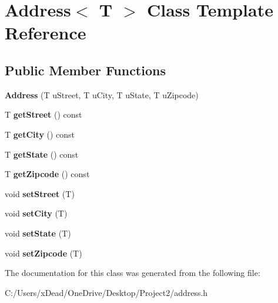 \hypertarget{class_address}{}\section{Address$<$ T $>$ Class Template Reference}
\label{class_address}
\subsection*{Public Member Functions}
\begin{DoxyCompactItemize}
\item 
\mbox{\label{class_address_ad05fb76dc614b35275d213214617edf4}} 
{\bfseries Address} (T u\+Street, T u\+City, T u\+State, T u\+Zipcode)
\item 
\mbox{\label{class_address_a5c84d4df730b7fbf3120eed2ef35a21b}} 
T {\bfseries get\+Street} () const
\item 
\mbox{\label{class_address_adc523a1ccb8b47dc46dd78e9bb3b5177}} 
T {\bfseries get\+City} () const
\item 
\mbox{\label{class_address_ae1d5d7d69c0e4504d28a327b8f4e387b}} 
T {\bfseries get\+State} () const
\item 
\mbox{\label{class_address_a8805576e5233705a13718bcf8ae17fa5}} 
T {\bfseries get\+Zipcode} () const
\item 
\mbox{\label{class_address_afd2fc267d3399d0de53fcd076e2a5a6a}} 
void {\bfseries set\+Street} (T)
\item 
\mbox{\label{class_address_a21ca8eca65fdc713d190ea6e65bf6cab}} 
void {\bfseries set\+City} (T)
\item 
\mbox{\label{class_address_a8b50736db2bf9b1fa8e47a357920728c}} 
void {\bfseries set\+State} (T)
\item 
\mbox{\label{class_address_a366e5ebcdc92a08e97a77031a675b925}} 
void {\bfseries set\+Zipcode} (T)
\end{DoxyCompactItemize}


The documentation for this class was generated from the following file\+:\begin{DoxyCompactItemize}
\item 
C\+:/\+Users/x\+Dead/\+One\+Drive/\+Desktop/\+Project2/address.\+h\end{DoxyCompactItemize}
